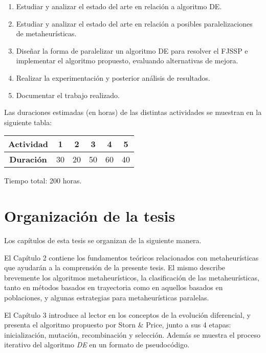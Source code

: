 \begin{enumerate}
    \item Estudiar y analizar el estado del arte en relación a algoritmo DE.
    \item Estudiar y analizar el estado del arte en relación a posibles paralelizaciones de
metaheurísticas.
    \item Diseñar la forma de paralelizar un algoritmo DE para resolver el FJSSP e implementar el algoritmo propuesto, evaluando alternativas de mejora.
    \item Realizar la experimentación y posterior análisis de resultados.
    \item Documentar el trabajo realizado.
\end{enumerate}

Las duraciones estimadas (en horas) de las distintas actividades se muestran en la siguiente tabla:

\begin{table}[h]
\centering
\begin{tabular}{|c|c|c|c|c|c|}
\hline
\textbf{Actividad} & \textbf{1} & \textbf{2} & \textbf{3} & \textbf{4} & \textbf{5} \\ \hline
\textbf{Duración}  & 30         & 20         & 50         & 60         & 40         \\ \hline
\end{tabular}
\end{table}

Tiempo total: 200 horas.

\section{Organización de la tesis}
Los capítulos de esta tesis se organizan de la siguiente manera.


El Capítulo 2 contiene los fundamentos teóricos relacionados con metaheurísticas que ayudarán a la comprensión de la presente tesis. El mismo describe brevemente los algoritmos metaheurísticos, la clasificación de las metaheurísticas, tanto en métodos basados en trayectoria como en aquellos basados en poblaciones, y algunas estrategias para metaheurísticas paralelas.


El Capítulo 3 introduce al lector en los conceptos de la evolución diferencial, y presenta el algoritmo propuesto por Storn \& Price, junto a sus 4 etapas: inicialización, mutación, recombinación y selección. Además se muestra el proceso iterativo del algoritmo \textit{DE} en un formato de pseudocódigo.



